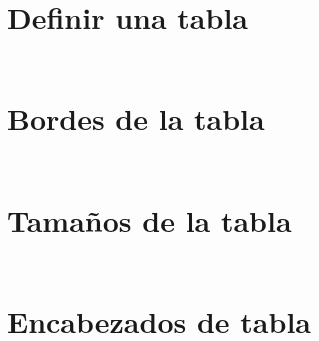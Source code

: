 
\section{Definir una tabla}

\begin{frame}[c]{}
\end{frame}

\begin{frame}[fragile]
  \frametitle{}

  \vspace{\baselineskip}
  \begin{lstlisting}

  \end{lstlisting}
\end{frame}

\section{Bordes de la tabla}

\begin{frame}[c]{}
\end{frame}

\begin{frame}[fragile]
  \frametitle{}

  \vspace{\baselineskip}
  \begin{lstlisting}

  \end{lstlisting}
\end{frame}

\section{Tamaños de la tabla}

\begin{frame}[c]{}
\end{frame}

\begin{frame}[fragile]
  \frametitle{}

  \vspace{\baselineskip}
  \begin{lstlisting}

  \end{lstlisting}
\end{frame}

\section{Encabezados de tabla}

